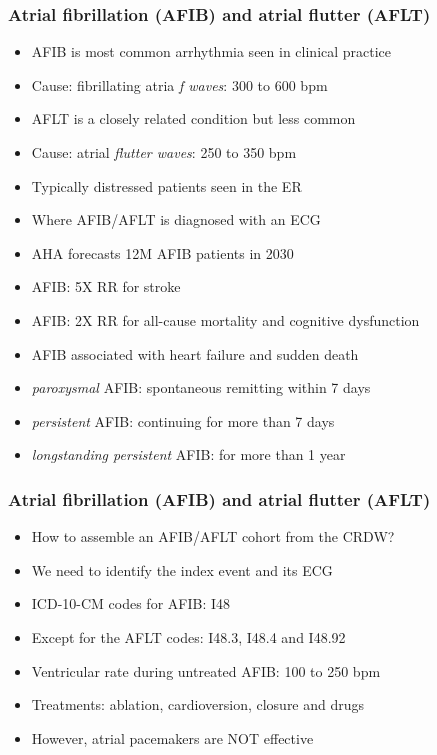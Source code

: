 \documentclass[11pt,pdftex,dvipsnames,usenames]{beamer}
\begin{document}
\begin{frame}\frametitle{Atrial fibrillation (AFIB) and atrial flutter (AFLT)}
\begin{itemize}
\item AFIB is most common arrhythmia seen in clinical practice
\item Cause: fibrillating atria {\it f waves}: 300 to 600 bpm
\item AFLT is a closely related condition but less common
\item Cause: atrial {\it flutter waves}: 250 to 350 bpm
\item Typically distressed patients seen in the ER
\item Where AFIB/AFLT is diagnosed with an ECG
\item AHA forecasts 12M AFIB patients in 2030 
\item AFIB: 5X RR for stroke
\item AFIB: 2X RR for all-cause mortality and cognitive dysfunction
\item AFIB associated with heart failure and sudden death
\item {\it paroxysmal} AFIB: spontaneous remitting within 7 days 
\item {\it persistent} AFIB: continuing for more than 7 days 
\item {\it longstanding persistent} AFIB: for more than 1 year
\end{itemize}
\end{frame}


\begin{frame}\frametitle{Atrial fibrillation (AFIB) and atrial flutter (AFLT)}
\begin{itemize}
\item How to assemble an AFIB/AFLT cohort from the CRDW?
\item We need to identify the index event and its ECG
\item ICD-10-CM codes for AFIB: I48
\item Except for the AFLT codes: I48.3, I48.4 and I48.92
\item Ventricular rate during untreated AFIB: 100 to 250 bpm

\item Treatments: ablation, cardioversion, closure and drugs
\item However, atrial pacemakers are NOT effective 
\end{itemize}
\end{frame}
\end{document}
